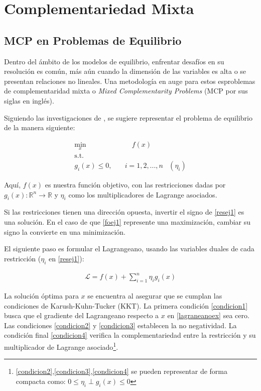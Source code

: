\section{Complementariedad Mixta}\label{c27}

\subsection{MCP en Problemas de Equilibrio}\label{c27.1}

Dentro del ámbito de los modelos de equilibrio, enfrentar desafíos en su resolución es común, más aún cuando la dimensión de las variables es alta o se presentan relaciones no lineales. Una metodología en auge para estos esproblemas de complementaridad mixta o \textit{Mixed Complementarity Problems} (MCP por sus siglas en inglés).

\vspace{2.5mm}

Siguiendo las investigaciones de , se sugiere representar el problema de equilibrio de la manera siguiente:

\begin{align}
    \min_{x} & \quad f(x) \label{foej1}\\ 
    \textrm{s.t.} \nonumber\\
    g_{i}(x) \leq 0 ,\quad & i=1,2,...,n  &(\eta_{i}) \label{resej1} 
\end{align}

Aquí, \( f(x) \) es nuestra función objetivo, con las restricciones dadas por \( g_{i}(x): \mathbb{R}^n \rightarrow \mathbb{R} \) y \( \eta_i \) como los multiplicadores de Lagrange asociados. 
\vspace{2.5mm}

Si las restricciones tienen una dirección opuesta, invertir el signo de \ref{resej1} es una solución. En el caso de que \ref{foej1} represente una maximización, cambiar su signo la convierte en una minimización.
\vspace{2.5mm}

El siguiente paso es formular el Lagrangeano, usando las variables duales de cada restricción (\( \eta_{i} \) en \ref{resej1}):

\begin{align}
    \mathcal{L}=f(x) +  \sum_{i=1}^{n}\eta_{i}g_{i}(x)\label{lagraneanoex}
\end{align}

La solución óptima para \( x \) se encuentra al asegurar que se cumplan las condiciones de Karush-Kuhn-Tucker (KKT). La primera condición \ref{condicion1} busca que el gradiente del Lagrangeano respecto a \( x \) en \ref{lagraneanoex} sea cero. Las condiciones \ref{condicion2} y \ref{condicion3} establecen la no negatividad. La condición final \ref{condicion4} verifica la complementariedad entre la restricción y su multiplicador de Lagrange asociado\footnote{\ref{condicion2},\ref{condicion3},\ref{condicion4} se pueden representar de forma compacta como: \( 0\leq\eta_{i}\perp g_{i}(x)\leq 0 \)}.

